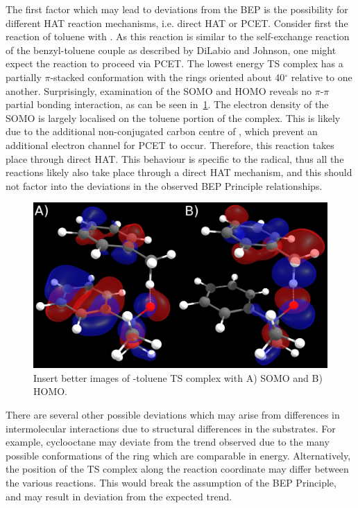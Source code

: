 The first factor which may lead to deviations from the BEP is the possibility for different HAT reaction mechanisms, i.e. direct HAT or PCET. Consider first the reaction of toluene with \cumo. As this reaction is similar to the self-exchange reaction of the benzyl-toluene couple as described by DiLabio and Johnson,\cite{DiLabio2007} one might expect the reaction to proceed via PCET. The lowest energy TS complex has a partially $\pi$-stacked conformation with the rings oriented about 40$^\circ$ relative to one another. Surprisingly, examination of the SOMO and HOMO reveals no $\pi$-$\pi$ partial bonding interaction, as can be seen in~\ref{fig:cumo-toluene}. The electron density of the SOMO is largely localised on the toluene portion of the complex. This is likely due to the additional non-conjugated carbon centre of \cumo, which prevent an additional electron channel for PCET to occur. Therefore, this reaction takes place through direct HAT. This behaviour is specific to the \cumo radical, thus all the reactions likely also take place through a direct HAT mechanism, and this should not factor into the deviations in the observed BEP Principle relationships.

\begin{figure}[htb]
  \includegraphics[width=\textwidth]{figures/cumo-toluene}
  \caption{Insert better images of \cumo-toluene TS complex with A) SOMO and B) HOMO.}
  \label{fig:cumo-toluene}
\end{figure}

There are several other possible deviations which may arise from differences in intermolecular interactions due to structural differences in the substrates. For example, cyclooctane may deviate from the trend observed due to the many possible conformations of the ring which are comparable in energy.\cite{Dorofeeva1985} Alternatively, the position of the TS complex along the reaction coordinate may differ between the various reactions. This would break the assumption of the BEP Principle, and may result in deviation from the expected trend.

